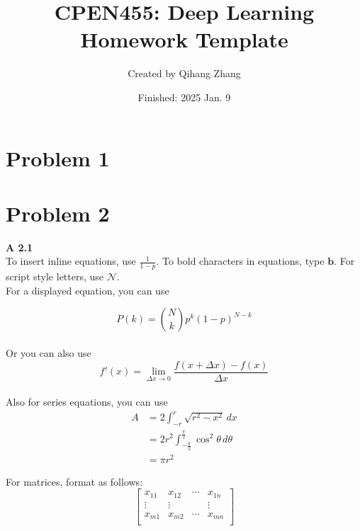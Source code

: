 \documentclass{article}
\title{CPEN455: Deep Learning \\ Homework Template}
\author{Created by 
Qihang Zhang}
\date{Finished: 2025 Jan. 9}
\begin{document}
\pagestyle{fancy}
\fancyhead{} %

\maketitle
\thispagestyle{fancy}


\section{Problem 1}

\section{Problem 2}
\noindent
\textbf{A 2.1}\\

\noindent
To insert inline equations, use $\frac{1}{1-p}$. To bold characters in equations, type $\mathbf{b}$. For script style letters, use $\mathcal{N}$.\\

\noindent
For a displayed equation, you can use

\begin{equation}
    P(k) = {N \choose k}p^{k}(1-p)^{N - k}
\end{equation}\\
Or you can also use 
$$
f'(x) = \lim_{\Delta x \to 0} \frac{f(x + \Delta x) - f(x)}{\Delta x}
$$\\
Also for series equations, you can use
\begin{align}
A &= 2 \int_{-r}^{r} \sqrt{r^2 - x^2} \, dx \\
  &= 2r^2 \int_{-\frac{\pi}{2}}^{\frac{\pi}{2}} \cos^2\theta \, d\theta \\
  &= \pi r^2 
\end{align}


\noindent
For matrices, format as follows:
\begin{equation}
    \begin{bmatrix}
    x_{11} & x_{12} & \cdots & x_{1n} \\
    \vdots & \vdots & & \vdots \\
    x_{m1} & x_{m2} & \cdots & x_{mn} \\
    \end{bmatrix}
\end{equation} \\
\end{document}
